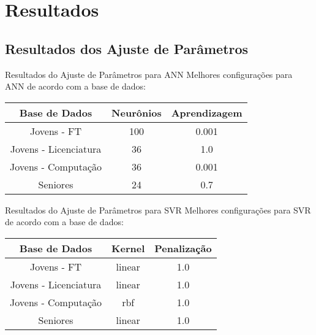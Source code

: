 \section{Resultados}
\subsection{Resultados dos Ajuste de Parâmetros}
\begin{frame}{Resultados do Ajuste de Parâmetros para ANN}
    Melhores configurações para ANN de acordo com a base de dados: 
    \begin{table}
    \begin{center}
        \begin{tabular}[c]{| c | c | c |}
        \hline
        \textbf{Base de Dados} & \textbf{Neurônios} & \textbf{Aprendizagem} \\
        \hline
        Jovens - FT & 100 & 0.001 \\
        \hline
        Jovens - Licenciatura & 36 & 1.0 \\
        \hline
        Jovens - Computação & 36 & 0.001 \\
        \hline
        Seniores & 24  & 0.7 \\
        \hline
    \end{tabular}
    \end{center}
    \end{table}
\end{frame}

\begin{frame}{Resultados do Ajuste de Parâmetros para SVR}
    Melhores configurações para SVR de acordo com a base de dados: 
    \begin{table}
    \begin{center}
    \begin{tabular}[c]{| c | c | c |}
        \hline
        \textbf{Base de Dados} & \textbf{Kernel} & \textbf{Penalização} \\
        \hline
        Jovens - FT & linear & 1.0 \\
        \hline
        Jovens - Licenciatura & linear & 1.0 \\
        \hline
        Jovens - Computação & rbf & 1.0 \\
        \hline
        Seniores & linear & 1.0 \\
        \hline
    \end{tabular}
    \end{center}
    \end{table}
\end{frame}

